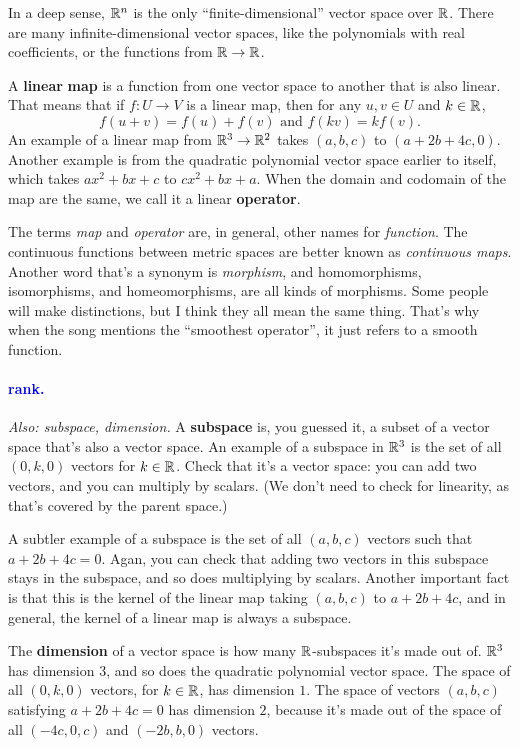 \documentclass[11pt,paper=letter]{scrartcl}
\renewcommand{\bluebf}[1]{{\bfseries \color{Blue} #1}}
\renewcommand\wp[1]{\paragraph{\textcolor{Blue}{#1.}} \hspace{-1em}}
\newcommand\wl[1]{\label{w:#1}}
\newcommand\oww[1]{\textit{Also: #1.}}
\begin{document}
\begin{remboxed}
  In a deep sense, $\mathbb R^n$ is the only ``finite-dimensional'' vector space over $\mathbb R$. There are many infinite-dimensional vector spaces, like the polynomials with real coefficients, or the functions from $\mathbb R \to \mathbb R$.
\end{remboxed}

A \textbf{linear} \bluebf{map} is a function from one vector space to another that is also linear. That means that if $f : U \to V$ is a linear map, then for any $u, v \in U$ and $k \in \mathbb R$, \[
  f(u + v) = f(u) + f(v) \text{ and } f(kv) = kf(v).
\]
An example of a linear map from $\mathbb R^3 \to \mathbb R^2$ takes $(a, b, c)$ to $(a + 2b + 4c, 0)$. Another example is from the quadratic polynomial vector space earlier to itself, which takes $ax^2 + bx + c$ to $cx^2 + bx + a$. When the domain and codomain of the map are the same, we call it a linear \bluebf{operator}.

\begin{remboxed}
  The terms \textit{map} and \textit{operator} are, in general, other names for \textit{function}. The continuous functions between metric spaces are better known as \textit{continuous maps}. Another word that's a synonym is \textit{morphism}, and homomorphisms, isomorphisms, and homeomorphisms, are all kinds of morphisms. Some people will make distinctions, but I think they all mean the same thing. That's why when the song mentions the ``smoothest operator'', it just refers to a smooth function.
\end{remboxed}

\wp{rank}
\wl{rank}
\oww{subspace, dimension}
A \textbf{subspace} is, you guessed it, a subset of a vector space that's also a vector space. An example of a subspace in $\mathbb R^3$ is the set of all $(0, k, 0)$ vectors for $k \in \mathbb R$. Check that it's a vector space: you can add two vectors, and you can multiply by scalars. (We don't need to check for linearity, as that's covered by the parent space.)

A subtler example of a subspace is the set of all $(a, b, c)$ vectors such that $a + 2b + 4c = 0$. Agan, you can check that adding two vectors in this subspace stays in the subspace, and so does multiplying by scalars. Another important fact is that this is the kernel of the linear map taking $(a, b, c)$ to $a + 2b + 4c$, and in general, the kernel of a linear map is always a subspace.

The \textbf{dimension} of a vector space is how many $\mathbb R$-subspaces it's made out of. $\mathbb R^3$ has dimension $3$, and so does the quadratic polynomial vector space. The space of all $(0, k, 0)$ vectors, for $k \in \mathbb R$, has dimension $1$. The space of vectors $(a, b, c)$ satisfying $a + 2b + 4c = 0$ has dimension $2$, because it's made out of the space of all $(-4c, 0, c)$ and $(-2b, b, 0)$ vectors.
\end{document}
